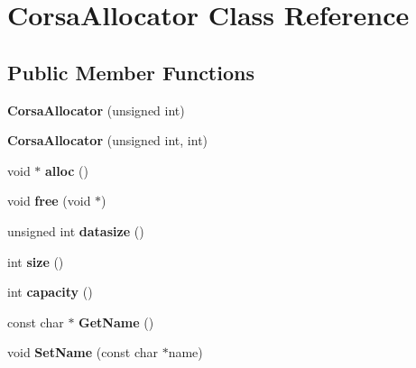 \hypertarget{classCorsaAllocator}{}\section{Corsa\+Allocator Class Reference}
\label{classCorsaAllocator}
\subsection*{Public Member Functions}
\begin{DoxyCompactItemize}
\item 
\mbox{\label{classCorsaAllocator_ac5c54488d1544d2877064a172ea26c68}} 
{\bfseries Corsa\+Allocator} (unsigned int)
\item 
\mbox{\label{classCorsaAllocator_aa4180c34c68b787dcf30e8aad5eb80d2}} 
{\bfseries Corsa\+Allocator} (unsigned int, int)
\item 
\mbox{\label{classCorsaAllocator_ab2f561e189f9d726feae41f5c96c41fb}} 
void $\ast$ {\bfseries alloc} ()
\item 
\mbox{\label{classCorsaAllocator_a3b826bb2f74ba8f778f1db7312c2fb1a}} 
void {\bfseries free} (void $\ast$)
\item 
\mbox{\label{classCorsaAllocator_a4d97e1eee898530930d386df3e48e750}} 
unsigned int {\bfseries datasize} ()
\item 
\mbox{\label{classCorsaAllocator_a3749ea000e4d5fda21ba36256b689f80}} 
int {\bfseries size} ()
\item 
\mbox{\label{classCorsaAllocator_abda8729d4325c3c4204acfb2ba270eed}} 
int {\bfseries capacity} ()
\item 
\mbox{\label{classCorsaAllocator_a5705b3bb6bffefcb11f78d0ca28c55ab}} 
const char $\ast$ {\bfseries Get\+Name} ()
\item 
\mbox{\label{classCorsaAllocator_aab50d589bc0d70a01521438577b7e9da}} 
void {\bfseries Set\+Name} (const char $\ast$name)
\item 

\end{DoxyCompactItemize}

